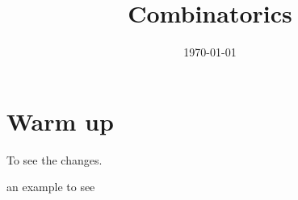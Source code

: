 \documentclass[paper=6.125in:9.25in,twoside,openright,pagesize=pdftex,10pt]{scrbook}
\title{Combinatorics}
\date{\today}
\theoremstyle{definition}
\theoremstyle{remark}
\theoremstyle{definition}
\numberwithin{problem}{chapter}
\numberwithin{remark}{chapter}
\begin{document}
\frontmatter


\mainmatter
{}


\chapter{Warm up}

To see the changes. 
\begin{example}
an example to see
\end{example}

\backmatter
\renewcommand{\listtheoremname}{List of problems and examples}
\renewcommand\indexname{Index of named problems}

\printindex
\printbibliography

%
\end{document}
